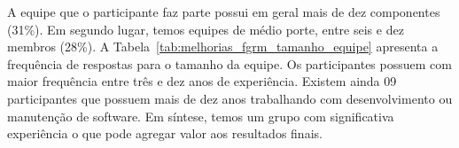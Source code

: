\begin{table}[htpb]
\centering
{}
\caption{Localização Geográfica dos Participantes}\label{tab:melhorias_fgrm_localizacao_geografica}
\end{table}

A equipe que o participante faz parte possui em geral mais de dez componentes
(31\%). Em segundo lugar, temos equipes de médio porte, entre seis e dez
membros (28\%). A Tabela~\ref{tab:melhorias_fgrm_tamanho_equipe} apresenta a
frequência de respostas para o tamanho da equipe. Os participantes possuem com
maior frequência entre três e dez anos de experiência. Existem ainda 09
participantes que possuem mais de dez anos trabalhando com desenvolvimento ou
manutenção de software. Em síntese, temos um grupo com significativa
experiência o que pode agregar valor aos resultados finais.

\begin{table}[htpb]
\centering
{}
\caption{Tamanho da equipe dos participantes}\label{tab:melhorias_fgrm_tamanho_equipe}
\end{table}


